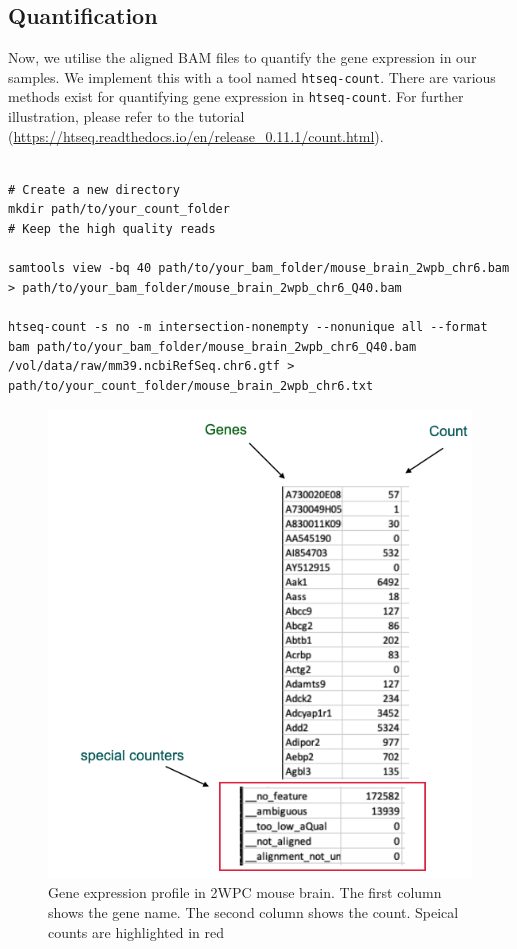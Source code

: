 \documentclass[
]{book}
\begin{document}
\hypertarget{quantification}{%
\subsection{Quantification}\label{quantification}}

Now, we utilise the aligned BAM files to quantify the gene expression in our samples. We implement this with a tool named \texttt{htseq-count}. There are various methods exist for quantifying gene expression in \texttt{htseq-count}. For further illustration, please refer to the tutorial (\url{https://htseq.readthedocs.io/en/release_0.11.1/count.html}).

\begin{verbatim}

# Create a new directory
mkdir path/to/your_count_folder
# Keep the high quality reads

samtools view -bq 40 path/to/your_bam_folder/mouse_brain_2wpb_chr6.bam > path/to/your_bam_folder/mouse_brain_2wpb_chr6_Q40.bam

htseq-count -s no -m intersection-nonempty --nonunique all --format bam path/to/your_bam_folder/mouse_brain_2wpb_chr6_Q40.bam /vol/data/raw/mm39.ncbiRefSeq.chr6.gtf > path/to/your_count_folder/mouse_brain_2wpb_chr6.txt
\end{verbatim}

\begin{figure}
\centering
\includegraphics{figures/count_matrix.png}
\caption{Gene expression profile in 2WPC mouse brain. The first column shows the gene name. The second column shows the count. Speical counts are highlighted in red}
\end{figure}
\end{document}
